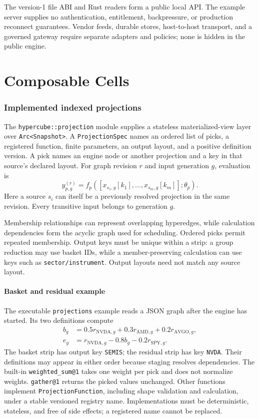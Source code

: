 \documentclass{strategynet-journal}
\begin{document}
The version-1 file ABI and Rust readers form a public local API.  The example
server supplies no authentication, entitlement,
backpressure, or production reconnect guarantees.  Vendor feeds, durable
stores, host-to-host transport, and a governed gateway require separate
adapters and policies; none is hidden in the public engine.

\part{Composable Cells}

\section{Implemented indexed projections}

The \texttt{hypercube::projection} module supplies a stateless materialized-view
layer over \texttt{Arc<Snapshot>}.  A \texttt{ProjectionSpec} names an ordered
list of picks, a registered function, finite parameters, an output layout,
and a positive definition version.  A pick names an engine node or another
projection and a key in that source's declared layout.  For graph revision
\(r\) and input generation \(g\), evaluation is
\[
  y_{p,g}^{(r)} = f_p\!\left(
    [x_{s_1,g}[k_1],\ldots,x_{s_m,g}[k_m]];\theta_p\right).
\]
Here a source \(s_i\) can itself be a previously resolved projection in the
same revision.  Every transitive input belongs to generation \(g\).

Membership relationships can represent overlapping hyperedges, while
calculation dependencies form the acyclic graph used for scheduling.
Ordered picks permit repeated membership.  Output keys must be unique within
a strip: a group reduction may use basket IDs, while a member-preserving
calculation can use keys such as \texttt{sector/instrument}.  Output layouts
need not match any source layout.

\subsection{Basket and residual example}

The executable \texttt{projections} example reads a JSON graph after the engine
has started.  Its two definitions compute
\begin{align*}
  b_g &= 0.5r_{\mathrm{NVDA},g}
       +0.3r_{\mathrm{AMD},g}+0.2r_{\mathrm{AVGO},g},\\
  e_g &= r_{\mathrm{NVDA},g}-0.8b_g-0.2r_{\mathrm{SPY},g}.
\end{align*}
The basket strip has output key \texttt{SEMIS}; the residual strip has key
\texttt{NVDA}.  Their definitions may appear in either order because staging
resolves dependencies.  The built-in \texttt{weighted\_sum@1} takes one weight
per pick and does not normalize weights.  \texttt{gather@1} returns the picked
values unchanged.  Other functions implement \texttt{ProjectionFunction},
including shape validation and calculation, under a stable versioned registry
name.  Implementations must be deterministic, stateless, and free of side
effects; a registered name cannot be replaced.
\end{document}
